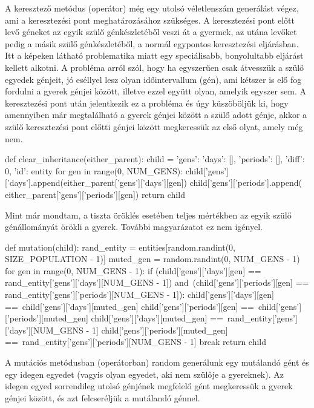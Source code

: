 A keresztező metódus (operátor) még egy utolsó véletlenszám generálást végez, ami a keresztezési pont meghatározásához szükséges. A keresztezési pont előtt levő géneket az egyik szülő génkészletéből veszi át a gyermek, az utána levőket pedig a másik szülő génkészletéből, a normál egypontos keresztezési eljárásban. Itt a képeken látható problematika miatt egy speciálisabb, bonyolultabb eljárást kellett alkotni. A probléma arról szól, hogy ha egyszerűen csak átvesszük a szülő egyedek génjeit, jó eséllyel lesz olyan időintervallum (gén), ami kétszer is elő fog fordulni a gyerek génjei között, illetve ezzel együtt olyan, amelyik egyszer sem. A keresztezési pont után jelentkezik ez a probléma és úgy küszöböljük ki, hogy amennyiben már megtalálható a gyerek génjei között a szülő adott génje, akkor a szülő keresztezési pont előtti génjei között megkeressük az első olyat, amely még nem.

\begin{python}
def clear_inheritance(either_parent):
    child = {'gens': {'days': [], 'periods': []}, 
             'diff': 0, 'id': entity}
    for gen in range(0, NUM_GENS):
        child['gens']['days'].append(either_parent['gens']['days'][gen])
        child['gens']['periods'].append(
            either_parent['gens']['periods'][gen])
    return child
\end{python}

Mint már mondtam, a tiszta öröklés esetében teljes mértékben az egyik szülő génállományát örökli a gyerek. További magyarázatot ez nem igényel.

\begin{python}
def mutation(child):
    rand_entity = entities[random.randint(0, SIZE_POPULATION - 1)]
    muted_gen = random.randint(0, NUM_GENS - 1)
    for gen in range(0, NUM_GENS - 1):
        if (child['gens']['days'][gen] ==
           rand_entity['gens']['days'][NUM_GENS - 1]) and\
           (child['gens']['periods'][gen] ==
           rand_entity['gens']['periods'][NUM_GENS - 1]):
            child['gens']['days'][gen] ==\
                child['gens']['days'][muted_gen]
            child['gens']['periods'][gen] ==\
                child['gens']['periods'][muted_gen]
            child['gens']['days'][muted_gen] ==\
                rand_entity['gens']['days'][NUM_GENS - 1]
            child['gens']['periods'][muted_gen] ==\
                rand_entity['gens']['periods'][NUM_GENS - 1]
            break
    return child
\end{python}

A mutációs metódusban (operátorban) random generálunk egy mutálandó gént és egy idegen egyedet (vagyis olyan egyedet, aki nem szülője a gyereknek). Az idegen egyed sorrendileg utolsó génjének megfelelő gént megkeressük a gyerek génjei között, és azt felcseréljük a mutálandó génnel.

